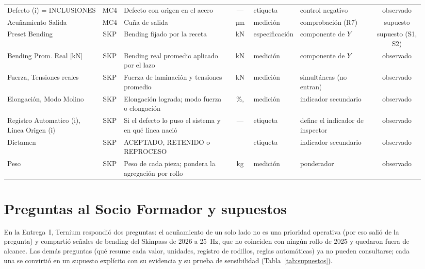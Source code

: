 \begin{table}[!h]
\begin{tabular}{L{3.2cm}cL{4.4cm}cL{1.8cm}L{2.5cm}c}
Defecto (i) = INCLUSIONES & MC4 & Defecto con origen en el acero & --- & etiqueta & control negativo & observado \\
Acuñamiento Salida & MC4 & Cuña de salida & µm & medición & comprobación (R7) & supuesto \\
Preset Bending & SKP & Bending fijado por la receta & kN & especificación & componente de $Y$ & supuesto (S1, S2) \\
Bending Prom. Real [kN] & SKP & Bending real promedio aplicado por el lazo & kN & medición & componente de $Y$ & observado \\
Fuerza, Tensiones reales & SKP & Fuerza de laminación y tensiones promedio & kN & medición & simultáneas (no entran) & observado \\
Elongación, Modo Molino & SKP & Elongación lograda; modo fuerza o elongación & \%, --- & medición & indicador secundario & observado \\
Registro Automatico (i), Linea Origen (i) & SKP & Si el defecto lo puso el sistema y en qué línea nació & --- & etiqueta & define el indicador de inspector & observado \\
Dictamen & SKP & ACEPTADO, RETENIDO o REPROCESO & --- & etiqueta & indicador secundario & observado \\
Peso & SKP & Peso de cada pieza; pondera la agregación por rollo & kg & medición & ponderador & observado \\
\bottomrule
\end{tabular}
\end{table}

\section{Preguntas al Socio Formador y supuestos}
\label{sec:anexo-supuestos}
En la Entrega~I, Ternium respondió dos preguntas: el acuñamiento de un solo lado no es una prioridad operativa (por
eso salió de la pregunta) y compartió señales de bending del Skinpass de 2026 a 25~Hz, que no coinciden con ningún
rollo de 2025 y quedaron fuera de alcance. Las demás preguntas (qué resume cada valor, unidades, registro de rodillos,
reglas automáticas) ya no pueden consultarse; cada una se convirtió en un supuesto explícito con su evidencia y su
prueba de sensibilidad (Tabla~\ref{tab:supuestos}).

